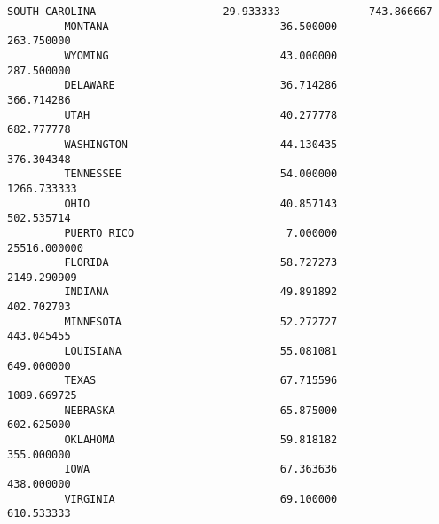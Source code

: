 \documentclass[11pt]{article}
\begin{document}
\begin{Verbatim}[commandchars=\\\{\}]
         SOUTH CAROLINA                    29.933333              743.866667   
         MONTANA                           36.500000              263.750000   
         WYOMING                           43.000000              287.500000   
         DELAWARE                          36.714286              366.714286   
         UTAH                              40.277778              682.777778   
         WASHINGTON                        44.130435              376.304348   
         TENNESSEE                         54.000000             1266.733333   
         OHIO                              40.857143              502.535714   
         PUERTO RICO                        7.000000            25516.000000   
         FLORIDA                           58.727273             2149.290909   
         INDIANA                           49.891892              402.702703   
         MINNESOTA                         52.272727              443.045455   
         LOUISIANA                         55.081081              649.000000   
         TEXAS                             67.715596             1089.669725   
         NEBRASKA                          65.875000              602.625000   
         OKLAHOMA                          59.818182              355.000000   
         IOWA                              67.363636              438.000000   
         VIRGINIA                          69.100000              610.533333   
         

\end{Verbatim}
\end{document}
